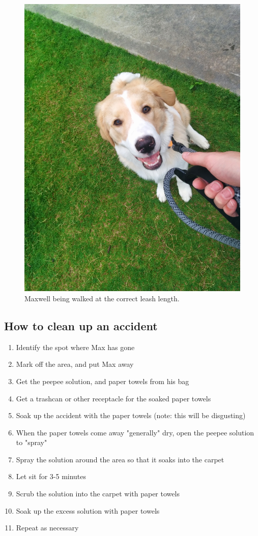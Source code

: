 \documentclass[pdftex,12pt]{article}
\begin{document}
\begin{figure}[H]
    \centering
    \includegraphics[width=.35\textwidth]{./images/how_to/walk_max/short_leash.jpg}
    \caption{Maxwell being walked at the correct leash length.}
    \label{fig:short_leash}
\end{figure}

\subsection{How to clean up an accident}
\begin{enumerate}\label{itm:how_to_clean_accident}
    \item Identify the spot where Max has gone
    \item Mark off the area, and put Max away
    \item Get the peepee solution, and paper towels from his bag
    \item Get a trashcan or other receptacle for the soaked paper towels
    \item Soak up the accident with the paper towels (note: this will be disgusting)
    \item When the paper towels come away "generally" dry, open the peepee solution to "spray"
    \item Spray the solution around the area so that it soaks into the carpet
    \item Let sit for 3-5 minutes
    \item Scrub the solution into the carpet with paper towels
    \item Soak up the excess solution with paper towels
    \item Repeat as necessary
\end{enumerate}
\end{document}

